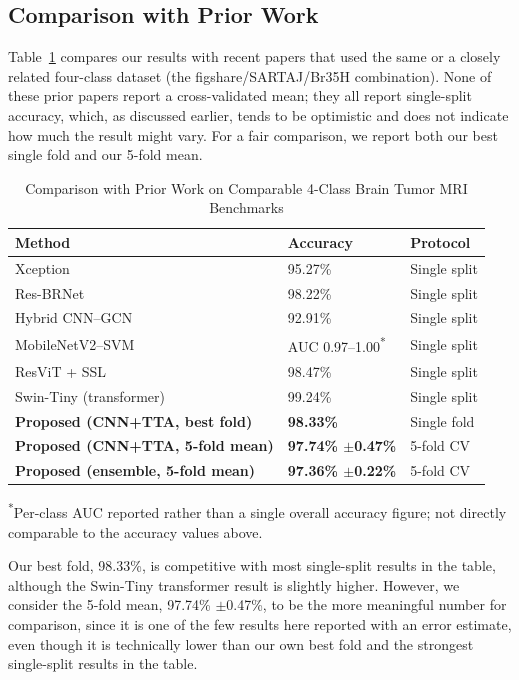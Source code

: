 \documentclass[conference]{IEEEtran}
\begin{document}
\subsection{Comparison with Prior Work}
Table~\ref{tab:sota_comparison} compares our results with recent papers that used the same or a closely related four-class dataset (the figshare/SARTAJ/Br35H combination). None of these prior papers report a cross-validated mean; they all report single-split accuracy, which, as discussed earlier, tends to be optimistic and does not indicate how much the result might vary. For a fair comparison, we report both our best single fold and our 5-fold mean.

\begin{table}[!htbp]
\centering
\caption{Comparison with Prior Work on Comparable 4-Class Brain Tumor MRI Benchmarks}
\begin{tabular}{|p{3.6cm}|p{1.6cm}|p{1.5cm}|}
\hline
\textbf{Method} & \textbf{Accuracy} & \textbf{Protocol} \\ \hline
Xception \cite{disci2025advanced} & 95.27\% & Single split \\ \hline
Res-BRNet \cite{zahoor2024resbrnet} & 98.22\% & Single split \\ \hline
Hybrid CNN--GCN \cite{cnngcn2024hybrid} & 92.91\% & Single split \\ \hline
MobileNetV2--SVM \cite{adamu2024mobilenetsvm} & AUC 0.97--1.00\textsuperscript{*} & Single split \\ \hline
ResViT + SSL \cite{r19} & 98.47\% & Single split \\ \hline
Swin-Tiny (transformer) \cite{gomezguzman2025swin} & 99.24\% & Single split \\ \hline
\textbf{Proposed (CNN+TTA, best fold)} & \textbf{98.33\%} & Single fold \\ \hline
\textbf{Proposed (CNN+TTA, 5-fold mean)} & \textbf{97.74\% $\pm$0.47\%} & 5-fold CV \\ \hline
\textbf{Proposed (ensemble, 5-fold mean)} & \textbf{97.36\% $\pm$0.22\%} & 5-fold CV \\ \hline
\end{tabular}

\vspace{1mm}
\footnotesize{\textsuperscript{*}Per-class AUC reported rather than a single overall accuracy figure; not directly comparable to the accuracy values above.}
\label{tab:sota_comparison}
\end{table}

Our best fold, 98.33\%, is competitive with most single-split results in the table, although the Swin-Tiny transformer result is slightly higher. However, we consider the 5-fold mean, 97.74\% $\pm$0.47\%, to be the more meaningful number for comparison, since it is one of the few results here reported with an error estimate, even though it is technically lower than our own best fold and the strongest single-split results in the table.
\end{document}
